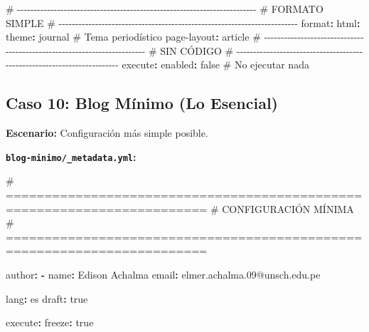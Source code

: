 \documentclass[
  doc,
  floatsintext,
  longtable,
  a4paper,
  nolmodern,
  notxfonts,
  notimes,
  12pt,
  colorlinks=true,linkcolor=blue,citecolor=blue,urlcolor=blue]{apa7}
\newenvironment{Shaded}{\begin{snugshade}}{\end{snugshade}}
\newcommand{\AttributeTok}[1]{\textcolor[rgb]{0.40,0.45,0.13}{#1}}
\newcommand{\CharTok}[1]{\textcolor[rgb]{0.13,0.47,0.30}{#1}}
\newcommand{\CommentTok}[1]{\textcolor[rgb]{0.37,0.37,0.37}{#1}}
\newcommand{\FunctionTok}[1]{\textcolor[rgb]{0.28,0.35,0.67}{#1}}
\newcommand{\KeywordTok}[1]{\textcolor[rgb]{0.00,0.23,0.31}{\textbf{#1}}}
\begin{document}
\begin{Shaded}
\begin{Highlighting}[]
\CommentTok{\# {-}{-}{-}{-}{-}{-}{-}{-}{-}{-}{-}{-}{-}{-}{-}{-}{-}{-}{-}{-}{-}{-}{-}{-}{-}{-}{-}{-}{-}{-}{-}{-}{-}{-}{-}{-}{-}{-}{-}{-}{-}{-}{-}{-}{-}{-}{-}{-}{-}{-}{-}{-}{-}{-}{-}{-}{-}{-}{-}{-}{-}{-}{-}{-}{-}{-}{-}{-}{-}{-}{-}{-}}
\CommentTok{\# FORMATO SIMPLE}
\CommentTok{\# {-}{-}{-}{-}{-}{-}{-}{-}{-}{-}{-}{-}{-}{-}{-}{-}{-}{-}{-}{-}{-}{-}{-}{-}{-}{-}{-}{-}{-}{-}{-}{-}{-}{-}{-}{-}{-}{-}{-}{-}{-}{-}{-}{-}{-}{-}{-}{-}{-}{-}{-}{-}{-}{-}{-}{-}{-}{-}{-}{-}{-}{-}{-}{-}{-}{-}{-}{-}{-}{-}{-}{-}}
\FunctionTok{format}\KeywordTok{:}
\AttributeTok{  }\FunctionTok{html}\KeywordTok{:}
\AttributeTok{    }\FunctionTok{theme}\KeywordTok{:}\AttributeTok{ journal}\CommentTok{          \# Tema periodístico}
\AttributeTok{    }\FunctionTok{page{-}layout}\KeywordTok{:}\AttributeTok{ article}
\AttributeTok{    }
\CommentTok{\# {-}{-}{-}{-}{-}{-}{-}{-}{-}{-}{-}{-}{-}{-}{-}{-}{-}{-}{-}{-}{-}{-}{-}{-}{-}{-}{-}{-}{-}{-}{-}{-}{-}{-}{-}{-}{-}{-}{-}{-}{-}{-}{-}{-}{-}{-}{-}{-}{-}{-}{-}{-}{-}{-}{-}{-}{-}{-}{-}{-}{-}{-}{-}{-}{-}{-}{-}{-}{-}{-}{-}{-}}
\CommentTok{\# SIN CÓDIGO}
\CommentTok{\# {-}{-}{-}{-}{-}{-}{-}{-}{-}{-}{-}{-}{-}{-}{-}{-}{-}{-}{-}{-}{-}{-}{-}{-}{-}{-}{-}{-}{-}{-}{-}{-}{-}{-}{-}{-}{-}{-}{-}{-}{-}{-}{-}{-}{-}{-}{-}{-}{-}{-}{-}{-}{-}{-}{-}{-}{-}{-}{-}{-}{-}{-}{-}{-}{-}{-}{-}{-}{-}{-}{-}{-}}
\FunctionTok{execute}\KeywordTok{:}
\AttributeTok{  }\FunctionTok{enabled}\KeywordTok{:}\AttributeTok{ }\CharTok{false}\CommentTok{            \# No ejecutar nada}
\end{Highlighting}
\end{Shaded}

\subsection{Caso 10: Blog Mínimo (Lo
Esencial)}\label{caso-10-blog-muxednimo-lo-esencial}

\textbf{Escenario:} Configuración más simple posible.

\textbf{\texttt{blog-minimo/\_metadata.yml}:}

\begin{Shaded}
\begin{Highlighting}[]
\CommentTok{\# ========================================================================}
\CommentTok{\# CONFIGURACIÓN MÍNIMA}
\CommentTok{\# ========================================================================}

\FunctionTok{author}\KeywordTok{:}
\AttributeTok{  }\KeywordTok{{-}}\AttributeTok{ }\FunctionTok{name}\KeywordTok{:}\AttributeTok{ Edison Achalma}
\AttributeTok{    }\FunctionTok{email}\KeywordTok{:}\AttributeTok{ elmer.achalma.09@unsch.edu.pe}

\FunctionTok{lang}\KeywordTok{:}\AttributeTok{ es}
\FunctionTok{draft}\KeywordTok{:}\AttributeTok{ }\CharTok{true}

\FunctionTok{execute}\KeywordTok{:}
\AttributeTok{  }\FunctionTok{freeze}\KeywordTok{:}\AttributeTok{ }\CharTok{true}
\end{Highlighting}
\end{Shaded}
\end{document}
